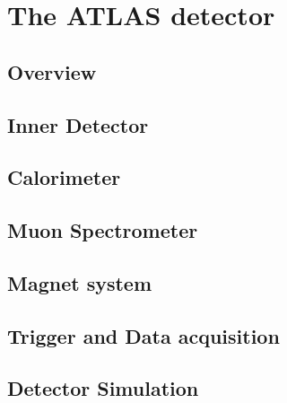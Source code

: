 \section{The ATLAS detector}
\subsection{Overview}
\subsection{Inner Detector}
\subsection{Calorimeter}
\subsection{Muon Spectrometer}
\subsection{Magnet system}
\subsection{Trigger and Data acquisition}
\subsection{Detector Simulation}


